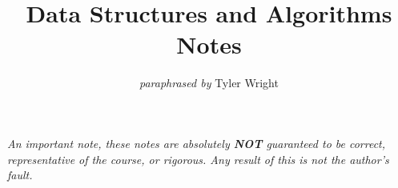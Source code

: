 \documentclass[a4paper, 12pt, twoside]{article}
\begin{document}
\title{Data Structures and Algorithms Notes}
\date{}
\author{\textit{paraphrased by} Tyler Wright}
\maketitle

\vfill

\textit{An important note, these notes are absolutely \textbf{NOT}
  guaranteed to be correct, representative of the course, or rigorous.
  Any result of this is not the author's fault.}

\addtocounter{section}{-1}



\newpage

\tableofcontents













\end{document}
